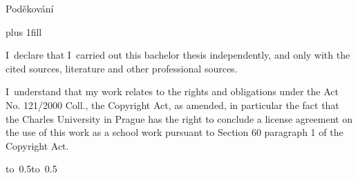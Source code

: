 \documentclass[12pt,a4paper,fleqn]{report}
\let\openright=\clearpage
\begin{document}
\newpage

Poděkování

\openright

\noindent



\vglue 0pt plus 1fill

\noindent
I~declare that I~carried out this bachelor thesis independently, and only with
the cited sources, literature and other professional sources.

\medskip\noindent
I~understand that my work relates to the rights and obligations under the Act
No. 121/2000 Coll., the Copyright Act, as amended, in particular the fact that
the Charles University in Prague has the right to conclude a license agreement
on the use of this work as a school work pursuant to Section 60 paragraph 1 of
the Copyright Act.

\vspace{10mm}

\hbox{\hbox to 0.5\hbox to 0.5}

\vspace{20mm}
\newpage

\end{document}
